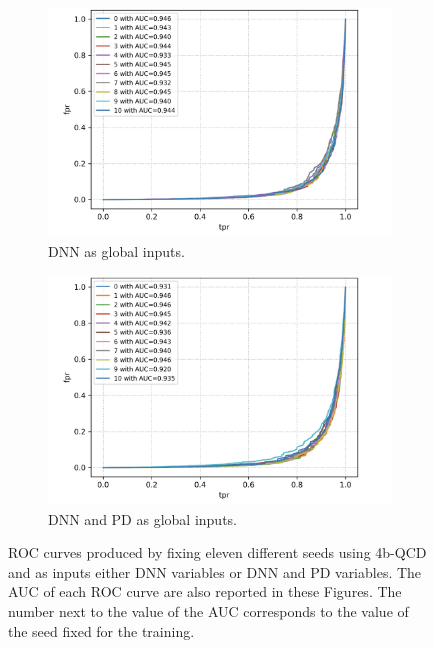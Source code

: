 \begin{figure}[hbt]
\centering
\begin{subfigure}{.5\textwidth}
  \centering
  \includegraphics[width=1.1\linewidth]{Images/7.S_B/Variability/4b QCD DNN.png}
  \caption{DNN as global inputs.}
  \label{fig: 4b QCD DNN}
\end{subfigure}%
\begin{subfigure}{.5\textwidth}
  \centering
  \includegraphics[width=1.1\linewidth]{Images/7.S_B/Variability/4b QCD prob diff and DNN.png}
  \caption{DNN and PD as global inputs.}
  \label{fig: 4b QCD DNN PD}
\end{subfigure}
\caption{ROC curves produced by fixing eleven different seeds using 4b-QCD and as inputs either DNN variables or DNN and PD variables. The AUC of each ROC curve are also reported in these Figures. The number next to the value of the AUC corresponds to the value of the seed fixed for the training.}
\label{fig: 4b QCD v ariability}
\end{figure}

